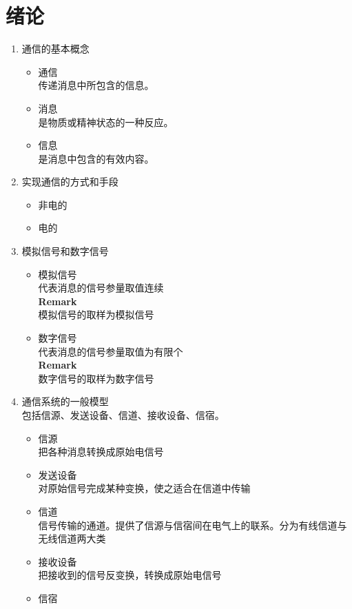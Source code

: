 \documentclass[UTF8]{ctexrep}
\renewcommand{\rem}{{\bfseries Remark}}
\begin{document}
\setlength\parindent{0em}
\chapter{绪论}
\thispagestyle{fancy}
\begin{enumerate}
\item 通信的基本概念
\begin{itemize}
\item 通信\\
传递消息中所包含的信息。
\item 消息\\
是物质或精神状态的一种反应。
\item 信息\\
是消息中包含的有效内容。
\end{itemize}
\item 实现通信的方式和手段
\begin{itemize}
\item 非电的
\item 电的
\end{itemize}
\item 模拟信号和数字信号
\begin{itemize}
\item 模拟信号\\
代表消息的信号参量取值连续\\
\rem\\
模拟信号的取样为模拟信号
\item 数字信号\\
代表消息的信号参量取值为有限个\\
\rem\\
数字信号的取样为数字信号
\end{itemize}
\item 通信系统的一般模型\\
包括信源、发送设备、信道、接收设备、信宿。
\begin{itemize}
\item 信源\\
把各种消息转换成原始电信号
\item 发送设备\\
对原始信号完成某种变换，使之适合在信道中传输
\item 信道\\
信号传输的通道。提供了信源与信宿间在电气上的联系。分为有线信道与无线信道两大类
\item 接收设备\\
把接收到的信号反变换，转换成原始电信号
\item 信宿\\

\end{itemize}
\end{enumerate}
\end{document}
